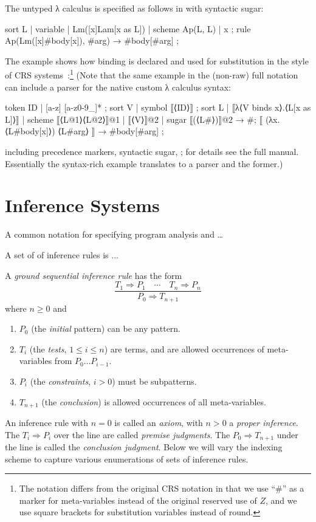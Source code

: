 \documentclass[letterpaper,11pt]{article}
\begin{document}
\begin{example}
  The untyped λ calculus is specified as follows in \hax with syntactic sugar:
  \begin{hacs}
    sort L | variable | Lm([x]Lam[x as L]) | scheme Ap(L, L) | x ;
    rule Ap(Lm([x]#body[x]), #arg) →  #body[#arg] ;
  \end{hacs}
  The example shows how binding is declared and used for substitution in the style of CRS
  systems~\cite{Klop+:tcs1993}:\footnote{The notation differs from the original CRS notation in that
    we use ``\#'' as a marker for meta-variables instead of the original reserved use of $Z$, and we
    use square brackets for substitution variables instead of round.}
  (Note that the same example in the (non-raw) full \HAX notation can include a parser for the
  native custom λ calculus syntax:
  \begin{hacs}
    token ID | [a-z] [a-z0-9_]* ;
    sort V | symbol ⟦⟨ID⟩⟧ ;
    sort L | ⟦λ⟨V binds x⟩.⟨L[x as L]⟩⟧ | scheme ⟦⟨L@1⟩⟨L@2⟩⟧@1
           | ⟦⟨V⟩⟧@2 | sugar ⟦(⟨L#⟩)⟧@2 →  #;
    ⟦ (λx.⟨L#body[x]⟩) ⟨L#arg⟩ ⟧ →  #body[#arg] ;
  \end{hacs}
  including precedence markers, syntactic sugar, \etc; for details see the full \HAX
  manual. Essentially the syntax-rich example translates to a parser and the former.)
\end{example}

\section{Inference Systems}
\label{sec:infer}

A common notation for specifying program analysis and …

A set of of inference rules is ...

\begin{definition}
  A \HAX \emph{ground sequential inference rule} has the form
  \begin{equation}
    \dfrac{ T_1 ⇒ P_1 \quad\cdots\quad T_n ⇒ P_n }{ P_0 ⇒ T_{n+1} }
    \label{eq:infer}
  \end{equation}
  where $n≥0$ and
  \begin{enumerate}
  \item $P_0$ (the \emph{initial} pattern) can be any \HAX pattern.
  \item $T_i$ (the \emph{tests}, $1≤i≤n$) are \HAX terms, and are allowed occurrences of meta-variables from $P_0…P_{i-1}$.
  \item $P_i$ (the \emph{constraints}, $i>0$) must be \HAX subpatterns.
  \item $T_{n+1}$ (the \emph{conclusion}) is allowed occurrences of all meta-variables.
  \end{enumerate}
  An inference rule with $n=0$ is called an \emph{axiom}, with $n>0$ a \emph{proper inference}.
  The $T_i⇒P_i$ over the line are called \emph{premise judgments}. The $P_0⇒T_{n+1}$ under the line
  is called the \emph{conclusion judgment}.
  Below we will vary the indexing scheme to capture various enumerations of sets of inference rules.
\end{definition}
\end{document}
